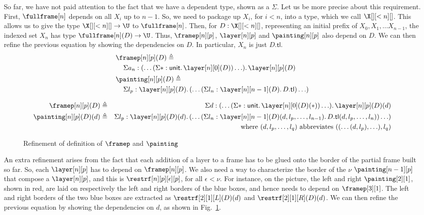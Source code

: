 \documentclass[10pt]{art.cls/art}
\newcommand{\unittype}{\ensuremath{\mathsf{unit}}}
\newcommand{\unitpoint}{\ensuremath{\ast}}
\newcommand{\defeq}{\ensuremath{\triangleq}}
\newcommand{\tl}{\ensuremath{\mathsf{tl}}}
\begin{document}
So far, we have not paid attention to the fact that we have a dependent type, shown as a $\Sigma$. Let us be more precise about this requirement. First, $\fullframe[n]$ depends on all $X_i$ up to $n - 1$. So, we need to package up $X_i$, for $i < n$, into a type, which we call $\X[][<n][]$. This allows us to give the type $\X[][<n][] \rightarrow \U$ to $\fullframe[n]$. Then, for $D: \X[][<n][]$, representing an initial prefix of $X_0, X_1, \ldots X_{n - 1}$, the indexed set $X_n$ has type $\fullframe[n](D) \rightarrow \U$. Thus, $\framep[n][p]$, $\layer[n][p]$ and $\painting[n][p]$ also depend on $D$. We can then refine the previous equation by showing the dependencies on $D$. In particular, $X_n$ is just $D.\tl$.
\begin{align*}
   & \framep[n][p](D) \defeq                                                                                  \\
   & \;\;\;\;\Sigma a_n: (\ldots (\Sigma \unitpoint: \unittype.\, \layer[n][0](D)) \ldots) .\,\layer[n][p](D) \\
   & \painting[n][p](D) \defeq                                                                                \\
   & \;\;\;\;\Sigma l_p: \layer[n][p](D).\, (\ldots (\Sigma l_n: \layer[n][n - 1](D) .\, D.\tl) \ldots)
\end{align*}

\begin{figure*}[!t]
  \begin{align*}
    \framep[n][p](D)      & \defeq & \Sigma d: (\ldots (\Sigma \unitpoint: \unittype.\, \layer[n][0](D)(\unitpoint)) \ldots).\, \layer[n][p](D)(d)                                \\
    \painting[n][p](D)(d) & \defeq & \Sigma l_p: \layer[n][p](D)(d).\, (\ldots (\Sigma l_n: \layer[n][n - 1](D)(d, l_p, \ldots, l_{n - 1}).\, D.\tl(d, l_p, \ldots, l_n)) \ldots) \\
                          &        & \text{where } (d, l_p, \ldots, l_q) \text{ abbreviates } ((\ldots(d, l_p), \ldots), l_q)
  \end{align*}
  \caption{Refinement of definition of $\framep$ and $\painting$\label{fig:refinement}}
\end{figure*}

An extra refinement arises from the fact that each addition of a layer to a frame has to be glued onto the border of the partial frame built so far. So, each $\layer[n][p]$ has to depend on $\framep[n][p]$. We also need a way to characterize the border of the $\nu$ $\painting[n-1][p]$ that compose a $\layer[n][p]$, and this is $\restrf[n][p][\epsilon][p]$, for all $\epsilon < \nu$. For instance, on the picture, the left and right $\painting[2][1]$, shown in red, are laid on respectively the left and right borders of the blue boxes, and hence needs to depend on $\framep[3][1]$. The left and right borders of the two blue boxes are extracted as $\restrf[2][1][L](D)(d)$ and $\restrf[2][1][R](D)(d)$. We can then refine the previous equation by showing the dependencies on $d$, as shown in Fig.~\ref{fig:refinement}.
\end{document}
